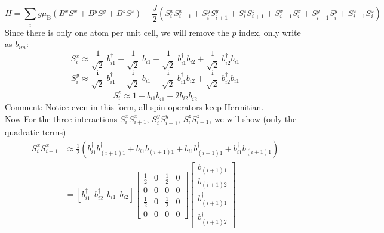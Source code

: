 \documentclass[letter]{article}
\newcommand{\ii}{\mathrm{i}}
\begin{document}
$$
H=\sum_{i}g\mu_{\mathrm{B}}(B^x S^x +B^y S^y+B^z S^z)-\frac{J}{2}(S_{i}^x S_{i+1}^x+S_{i}^y S_{i+1}^y+S_{i}^z S_{i+1}^z+S_{i-1}^x S_{i}^x+S_{i-1}^y S_{i}^y+S_{i-1}^z S_{i}^z)$$
Since there is only one atom per unit cell, we will remove the $p$ index, only write as $b_{im}$:
$$
S_{i}^{x}\approx\frac{1}{\sqrt{2}}\ b_{i1}^{\dagger}+\frac{1}{\sqrt{2}}\ b_{i1}+\frac{1}{\sqrt{2}}\  b_{i1}^{\dagger}b_{i2}+\frac{1}{\sqrt{2}}\  b_{i2}^{\dagger}b_{i1}$$$$
S_{i}^{y}\approx\frac{\ii}{\sqrt{2}}\ b_{i1}^{\dagger}-\frac{\ii}{\sqrt{2}}\ b_{i1}-\frac{\ii}{\sqrt{2}}\ b_{i1}^{\dagger}b_{i2}+\frac{\ii}{\sqrt{2}}\ b_{i2}^{\dagger}b_{i1}$$$$
S_{i}^{z}\approx1-b_{i1}b_{i1}^{\dagger}-2b_{i2}b_{i2}^{\dagger}$$
\indent Comment: Notice even in this form, all spin operators keep Hermitian.\\
\indent Now For the three interactions $S_{i}^x S_{i+1}^x$, $S_{i}^y S_{i+1}^y$, $S_{i}^z S_{i+1}^z$, we will show (only the quadratic terms)
$$
\begin{aligned}
    S_{i}^x S_{i+1}^x &\approx\frac{1}{2}\left(b_{i1}^{\dagger}b_{(i+1)1}^{\dagger}+b_{i1}b_{(i+1)1}+b_{i1}b_{(i+1)1}^{\dagger}+b_{i1}^{\dagger}b_{(i+1)1}\right)\\ &=\left[
        b_{i1}^{\dagger} \ \ 
        b_{i2}^{\dagger}\  \ 
        b_{i1}\ \ 
        b_{i2}\right]
       \begin{bmatrix}
            \frac{1}{2} & 0 & \frac{1}{2} & 0 \\
           0 &  0 & 0 &0 \\
           \frac{1}{2} &  0 & \frac{1}{2} &0\\
            0 & 0 & 0& 0
            \end{bmatrix}\begin{bmatrix}
                b_{(i+1)1}  \\
                b_{(i+1)2}  \\
                b_{(i+1)1}^{\dagger}\\
                b_{(i+1)2}^{\dagger}
                \end{bmatrix}
\end{aligned}
$$
\end{document}
